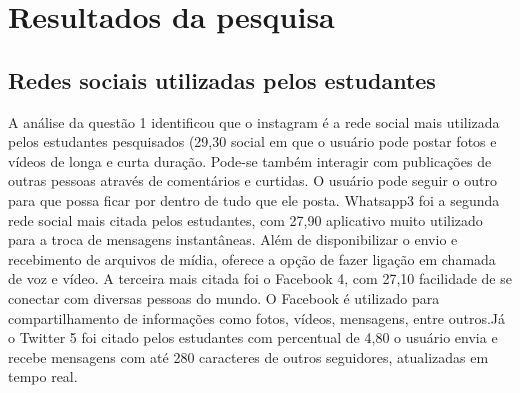 \section{Resultados da pesquisa}
\subsection{Redes sociais utilizadas pelos
estudantes}

A análise da questão 1 identificou que o instagram
é a rede social mais utilizada pelos estudantes
pesquisados (29,30%
social em que o usuário pode postar fotos e vídeos de
longa e curta duração. Pode-se também interagir com
publicações de outras pessoas através de comentários
e curtidas. O usuário pode seguir o outro para que
possa ficar por dentro de tudo que ele posta.
Whatsapp3 foi a segunda rede social mais citada
pelos estudantes, com 27,90%
aplicativo muito utilizado para a troca de mensagens
instantâneas. Além de disponibilizar o envio e
recebimento de arquivos de mídia, oferece a opção
de fazer ligação em chamada de voz e vídeo.
A terceira mais citada foi o Facebook 4, com
27,10%
facilidade de se conectar com diversas pessoas do
mundo. O Facebook é utilizado para compartilhamento
de informações como fotos, vídeos, mensagens,
entre outros.Já o Twitter 5 foi citado pelos estudantes com percentual de 4,80%
o usuário envia e recebe mensagens com até 280
caracteres de outros seguidores, atualizadas em
tempo real.